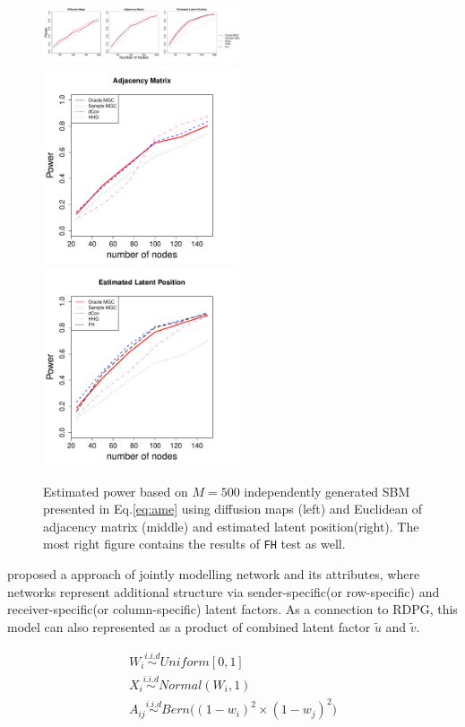 \documentclass[12pt]{article}
\theoremstyle{definition}
\begin{document}
\begin{figure}[H]
	\centering
	\label{fig:ame}
	\includegraphics[width=2.3in]{../Figure/ame.pdf}
	\includegraphics[width=2.3in]{../Figure/Eame.pdf}
	\includegraphics[width =2.3in]{../Figure/fame.pdf}
	\caption{Estimated power based on $M = 500$ independently generated SBM presented in Eq.\ref{eq:ame} using diffusion maps (left) and Euclidean of adjacency matrix (middle)  and estimated latent position(right). The most right figure contains the results of \texttt{FH} test as well.}
\end{figure}

	
\cite{hoff2002latent} proposed a approach of jointly modelling network and its attributes, where networks represent additional structure via sender-specific(or row-specific) and receiver-specific(or column-specific) latent factors.
As a connection to RDPG, this model can also represented as a product of combined latent factor $\tilde{u}$ and $\tilde{v}$. 
	
\begin{equation}
\label{eq:ame}
\begin{gathered}
	W_{i} \overset{i.i.d}{\sim} Uniform[0,1] \\ 
	X_{i} \overset{i.i.d}{\sim} Normal(W_{i}, 1) \\
	A_{ij}  \overset{i.i.d}{\sim} Bern \big(  ( 1 - w_{i})^2 \times (1 - w_{j})^2    \big)
\end{gathered}
\end{equation}
\end{document}
